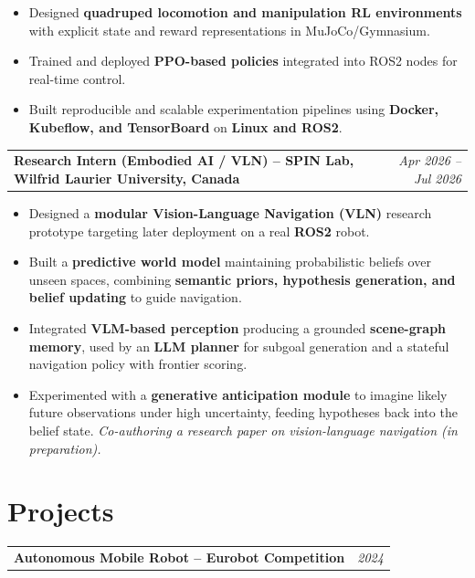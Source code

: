 \documentclass[10pt, letterpaper]{article}
\begin{document}
\begin{itemize}[leftmargin=0.5cm, itemsep=1pt]
    \item Designed \textbf{quadruped locomotion and manipulation RL environments} with explicit state and reward representations in MuJoCo/Gymnasium.
    \item Trained and deployed \textbf{PPO-based policies} integrated into ROS2 nodes for real-time control.
    \item Built reproducible and scalable experimentation pipelines using \textbf{Docker, Kubeflow, and TensorBoard} on \textbf{Linux and ROS2}.
\end{itemize}

\vspace{0.15cm}

\begin{tabularx}{\textwidth}{@{}Xr@{}}
\textbf{Research Intern (Embodied AI / VLN) – SPIN Lab, Wilfrid Laurier University, Canada} & \textit{Apr 2026 – Jul 2026} \\
\end{tabularx}

\begin{itemize}[leftmargin=0.5cm, itemsep=1pt]
    \item Designed a \textbf{modular Vision-Language Navigation (VLN)} research prototype targeting later deployment on a real \textbf{ROS2} robot.
    \item Built a \textbf{predictive world model} maintaining probabilistic beliefs over unseen spaces, combining \textbf{semantic priors, hypothesis generation, and belief updating} to guide navigation.
    \item Integrated \textbf{VLM-based perception} producing a grounded \textbf{scene-graph memory}, used by an \textbf{LLM planner} for subgoal generation and a stateful navigation policy with frontier scoring.
    \item Experimented with a \textbf{generative anticipation module} to imagine likely future observations under high uncertainty, feeding hypotheses back into the belief state. \textit{Co-authoring a research paper on vision-language navigation (in preparation).}
\end{itemize}

\section{Projects}

\begin{tabularx}{\textwidth}{@{}Xr@{}}
\textbf{Autonomous Mobile Robot – Eurobot Competition} & \textit{2024} \\
\end{tabularx}
\end{document}
